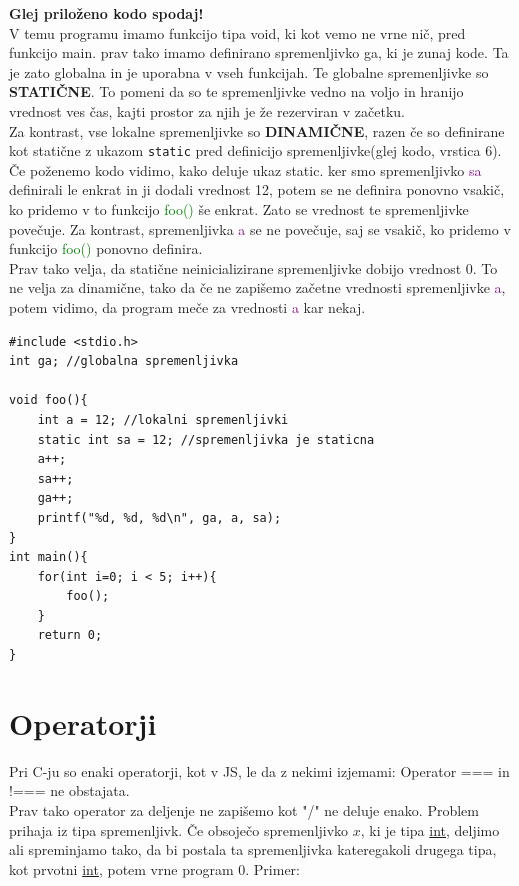 \documentclass[a4paper, 12pt]{article}
\begin{document}
\textbf{Glej priloženo kodo spodaj!}\\
V temu programu imamo funkcijo tipa void, ki kot vemo ne vrne nič, pred funkcijo main. prav tako imamo definirano spremenljivko ga, ki je zunaj kode. Ta je zato globalna in je uporabna v vseh funkcijah. Te globalne spremenljivke so \textbf{STATIČNE}. To pomeni da so te spremenljivke vedno na voljo in hranijo vrednost ves čas, kajti prostor za njih je že rezerviran v začetku.\\
Za kontrast, vse lokalne spremenljivke so \textbf{DINAMIČNE}, razen če so definirane kot statične z ukazom \lstinline|static| pred definicijo spremenljivke(glej kodo, vrstica 6). Če poženemo kodo vidimo, kako deluje ukaz static. ker smo spremenljivko \textcolor{purple}{sa} definirali le enkrat in ji dodali vrednost 12, potem se ne definira ponovno vsakič, ko pridemo v to funkcijo \textcolor{green}{foo()} še enkrat. Zato se vrednost te spremenljivke povečuje. Za kontrast, spremenljivka \textcolor{purple}{a} se ne povečuje, saj se vsakič, ko pridemo v funkcijo \textcolor{green}{foo()} ponovno definira.\\
Prav tako velja, da statične neinicializirane spremenljivke dobijo vrednost 0. To ne velja za dinamične, tako da če ne zapišemo začetne vrednosti spremenljivke \textcolor{purple}{a}, potem vidimo, da program meče za vrednosti \textcolor{purple}{a} kar nekaj.

\begin{lstlisting}
#include <stdio.h>
int ga; //globalna spremenljivka

void foo(){
	int a = 12;	//lokalni spremenljivki
	static int sa = 12; //spremenljivka je staticna
	a++;
	sa++;
	ga++;
	printf("%d, %d, %d\n", ga, a, sa);
}
int main(){
	for(int i=0; i < 5; i++){
		foo();
	}
	return 0;
}	
\end{lstlisting}

\section{Operatorji}

Pri C-ju so enaki operatorji, kot v JS, le da z nekimi izjemami: Operator === in !=== ne obstajata.\\
Prav tako operator za deljenje ne zapišemo kot "/" ne deluje enako. Problem prihaja iz tipa spremenljivk. Če obsoječo spremenljivko $x$, ki je tipa \underline{int}, deljimo ali spreminjamo tako, da bi postala ta spremenljivka kateregakoli drugega tipa, kot prvotni \underline{int}, potem vrne program 0. Primer:
\end{document}
